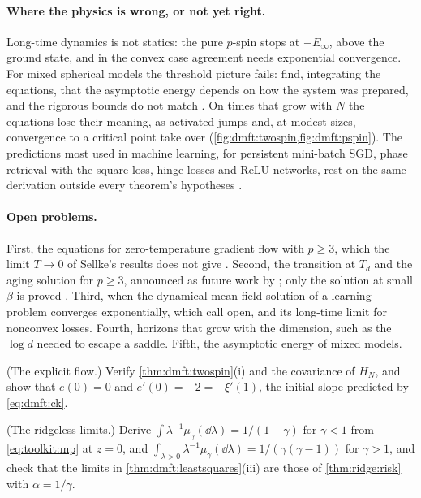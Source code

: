 \begin{refsection}
\paragraph{Where the physics is wrong, or not yet right.} Long-time dynamics is not statics: the pure $p$-spin stops at $-E_\infty$, above the ground state, and in the convex case agreement needs exponential convergence. For mixed spherical models the threshold picture fails: \textcite{FolenaFranzRicciTersenghi2020} find, integrating the equations, that the asymptotic energy depends on how the system was prepared, and the rigorous bounds do not match \parencite{Sellke2024}. On times that grow with $N$ the equations lose their meaning, as activated jumps and, at modest sizes, convergence to a critical point take over (\cref{fig:dmft:twospin,fig:dmft:pspin}). The predictions most used in machine learning, for persistent mini-batch SGD, phase retrieval with the square loss, hinge losses and ReLU networks, rest on the same derivation outside every theorem's hypotheses \parencite{MignaccoEtAl2021a,MignaccoEtAl2021b}.

\paragraph{Open problems.} First, the equations for zero-temperature gradient flow with $p\ge3$, which the limit $T\to0$ of Sellke's results does not give \parencite[Remark~1.5]{Sellke2024}. Second, the transition at $T_d$ and the aging solution for $p\ge3$, announced as future work by \textcite{BenArousDemboGuionnet2006}; only the solution at small $\beta$ is proved \parencite{DemboGuionnetMazza2007}. Third, when the dynamical mean-field solution of a learning problem converges exponentially, which \textcite{CelentanoChengMontanari2021} call open, and its long-time limit for nonconvex losses. Fourth, horizons that grow with the dimension, such as the $\log d$ needed to escape a saddle. Fifth, the asymptotic energy of mixed models.

\begin{exercises}
\item \consolidation (The explicit flow.) Verify \cref{thm:dmft:twospin}(i) and the covariance of $H_N$, and show that $e(0)=0$ and $e'(0)=-2=-\xi'(1)$, the initial slope predicted by \eqref{eq:dmft:ck}.\label{ex:dmft:flow}

\item \consolidation (The ridgeless limits.) Derive $\int\lambda^{-1}\mu_\gamma(\dd\lambda)=1/(1-\gamma)$ for $\gamma<1$ from \eqref{eq:toolkit:mp} at $z=0$, and $\int_{\lambda>0}\lambda^{-1}\mu_\gamma(\dd\lambda)=1/(\gamma(\gamma-1))$ for $\gamma>1$, and check that the limits in \cref{thm:dmft:leastsquares}(iii) are those of \cref{thm:ridge:risk} with $\alpha=1/\gamma$.\label{ex:dmft:ridgeless}


\end{exercises}
\end{refsection}
